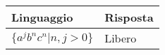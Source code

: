 \documentclass{standalone}
\begin{document}
\begin{tabularx}{\textwidth}{|X |X |}
	\toprule
		Linguaggio & Risposta \\
    \hline
        $\{ a^j b^n c^n | n, j > 0 \}$
        &
				Libero
        \\
    \bottomrule
\end{tabularx}
\end{document}
